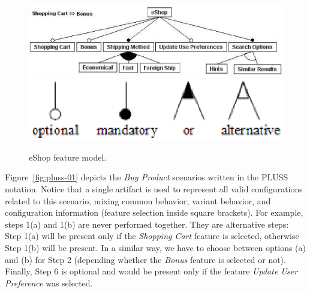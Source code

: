 \documentclass{acm_proc_article-sp}
\begin{document}
 \begin{figure}[th]
 \begin{center}
  \includegraphics[scale=0.45]{img/eShop-FM.eps}
   \includegraphics[scale=0.40]{img/fm-notation.eps}
  \caption{eShop feature model.}
  \label{fig:eshop-fm}
  \end{center}
\end{figure}




Figure~\ref{fig:pluss-01} depicts the \emph{Buy Product} scenarios written in
the PLUSS notation. Notice that a single artifact is used to represent all valid
configurations related to this scenario, mixing common behavior, variant
behavior, and configuration information (feature selection inside square
brackets). For example, steps 1(a) and 1(b) are never performed together. They
are alternative steps: Step 1(a) will be present only if the \emph{Shopping
Cart} feature is selected, otherwise Step 1(b) will be present. In a similar
way, we have to choose between options (a) and (b) for Step 2 (depending whether
the \emph{Bonus} feature is selected or not). Finally, Step 6 is optional and
would be present only if the feature \emph{Update User Preference} was selected.
\end{document}
